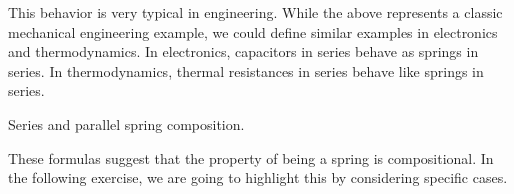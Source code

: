 \begin{remark}
    This behavior is very typical in engineering.
    While the above represents a classic mechanical engineering example, we could define similar examples in electronics and thermodynamics.
    In electronics, capacitors in series behave as springs in series.
    In thermodynamics, thermal resistances in series behave like springs in series.
\end{remark}

\begin{marginfigure}
    \centering
    \hspace{1cm}
    \caption{Series and parallel spring composition.}
    \label{fig:springs}
\end{marginfigure}

These formulas suggest that the property of being a spring is compositional.
In the following exercise, we are going to highlight this by considering specific cases.

